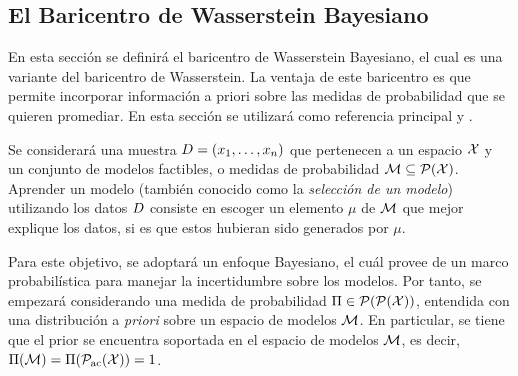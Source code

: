 {{{		}  %

		\subsection*{El Baricentro de Wasserstein Bayesiano}\label{ssec:baricentro-Wasserstein-Bayesiano}
		{
			En esta sección se definirá el baricentro de Wasserstein Bayesiano, el cual es una variante del baricentro de Wasserstein. La ventaja de este baricentro es que permite incorporar información a priori sobre las medidas de probabilidad que se quieren promediar. En esta sección se utilizará como referencia principal \cite{rios2020contributions} y \cite{backhoff2022bayesian}.

			Se considerará una muestra $\Data = \left(x_1,\ldots, x_n \right)$ que pertenecen a un espacio $\cX$ y un conjunto de modelos factibles, o medidas de probabilidad $\Models \subseteq \ProbSpace[\cX]$. Aprender un modelo (también conocido como la \emph{selección de un modelo}) utilizando los datos $\Data$  consiste en escoger un elemento $\mu$ de $\Models$ que mejor explique los datos, si es que estos hubieran sido generados por $\mu$.

			Para este objetivo, se adoptará un enfoque Bayesiano, el cuál provee de un marco probabilística para manejar la incertidumbre sobre los modelos. Por tanto, se empezará considerando una medida de probabilidad $\Pi \in \ProbSpace[\ProbSpace[\cX] ] $, entendida con una distribución a \textit{priori} sobre un espacio de modelos $\Models$. En particular, se tiene que el prior se encuentra soportada en el espacio de modelos $\Models$, es decir, $\Pi(\Models) = \Pi(\ProbSpaceAC[\cX] ) = 1$.

}}}
